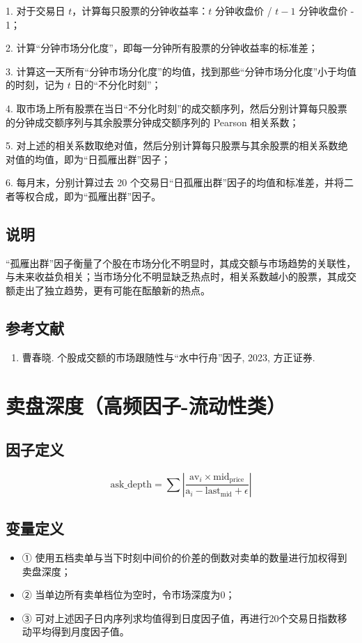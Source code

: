 \documentclass{article}
\begin{document}
1. 对于交易日 \( t \)，计算每只股票的分钟收益率：\( t \) 分钟收盘价 / \( t-1 \) 分钟收盘价 - 1；

2. 计算“分钟市场分化度”，即每一分钟所有股票的分钟收益率的标准差；

3. 计算这一天所有“分钟市场分化度”的均值，找到那些“分钟市场分化度”小于均值的时刻，记为 \( t \) 日的“不分化时刻”；

4. 取市场上所有股票在当日“不分化时刻”的成交额序列，然后分别计算每只股票的分钟成交额序列与其余股票分钟成交额序列的 Pearson 相关系数；

5. 对上述的相关系数取绝对值，然后分别计算每只股票与其余股票的相关系数绝对值的均值，即为“日孤雁出群”因子；

6. 每月末，分别计算过去 20 个交易日“日孤雁出群”因子的均值和标准差，并将二者等权合成，即为“孤雁出群”因子。

\subsection{说明}
“孤雁出群”因子衡量了个股在市场分化不明显时，其成交额与市场趋势的关联性，与未来收益负相关；当市场分化不明显缺乏热点时，相关系数越小的股票，其成交额走出了独立趋势，更有可能在酝酿新的热点。

\subsection{参考文献}
\begin{enumerate}
    \item 曹春晓. 个股成交额的市场跟随性与“水中行舟”因子, 2023, 方正证券.
\end{enumerate}

\section{卖盘深度（高频因子-流动性类）}

\subsection{因子定义}
\begin{equation}
    \mathrm{ask\_depth} = \sum \left| \frac{\mathrm{av}_i \times \mathrm{mid_{price}}}{\mathrm{a}_i - \mathrm{last_{mid}}+ \epsilon} \right| 
\end{equation}

\subsection{变量定义}
\begin{itemize}
    \item ① 使用五档卖单与当下时刻中间价的价差的倒数对卖单的数量进行加权得到卖盘深度；
    \item ② 当单边所有卖单档位为空时，令市场深度为0；
    \item ③ 可对上述因子日内序列求均值得到日度因子值，再进行20个交易日指数移动平均得到月度因子值。
\end{itemize}
\end{document}
